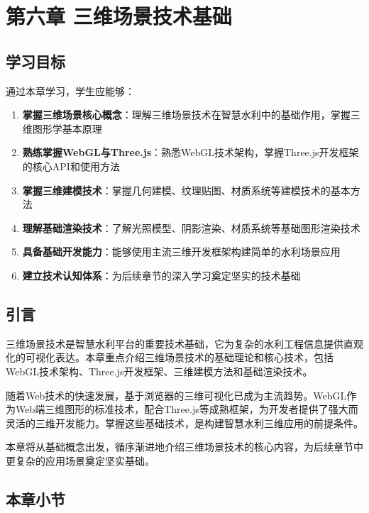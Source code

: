 \chapter{第六章 三维场景技术基础}

\section{学习目标}

通过本章学习，学生应能够：

\begin{enumerate}
\def\labelenumi{\arabic{enumi}.}
\tightlist
\item
  \textbf{掌握三维场景核心概念}：理解三维场景技术在智慧水利中的基础作用，掌握三维图形学基本原理
\item
  \textbf{熟练掌握WebGL与Three.js}：熟悉WebGL技术架构，掌握Three.js开发框架的核心API和使用方法
\item
  \textbf{掌握三维建模技术}：掌握几何建模、纹理贴图、材质系统等建模技术的基本方法
\item
  \textbf{理解基础渲染技术}：了解光照模型、阴影渲染、材质系统等基础图形渲染技术
\item
  \textbf{具备基础开发能力}：能够使用主流三维开发框架构建简单的水利场景应用
\item
  \textbf{建立技术认知体系}：为后续章节的深入学习奠定坚实的技术基础
\end{enumerate}

\section{引言}

三维场景技术是智慧水利平台的重要技术基础，它为复杂的水利工程信息提供直观化的可视化表达。本章重点介绍三维场景技术的基础理论和核心技术，包括WebGL技术架构、Three.js开发框架、三维建模方法和基础渲染技术。

随着Web技术的快速发展，基于浏览器的三维可视化已成为主流趋势。WebGL作为Web端三维图形的标准技术，配合Three.js等成熟框架，为开发者提供了强大而灵活的三维开发能力。掌握这些基础技术，是构建智慧水利三维应用的前提条件。

本章将从基础概念出发，循序渐进地介绍三维场景技术的核心内容，为后续章节中更复杂的应用场景奠定坚实基础。

\section{本章小节}

